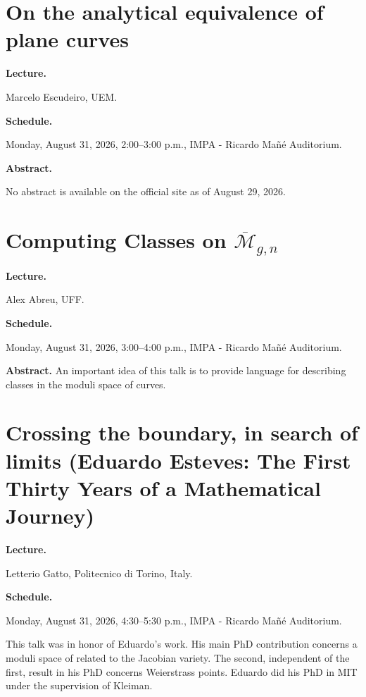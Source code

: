 \section{On the analytical equivalence of
plane curves}
\label{section-analytical-equivalence-curves}

\medskip\noindent
{\bf Lecture.}

Marcelo Escudeiro,
UEM.

\medskip\noindent
{\bf Schedule.}

Monday, August 31, 2026,
2:00--3:00 p.m.,
IMPA - Ricardo Ma\~n\'e Auditorium.

\medskip\noindent
{\bf Abstract.}

No abstract is available on the official
site as of August 29, 2026.

\section{Computing Classes on
$\overline{\mathcal{M}}_{g,n}$}
\label{section-computing-classes-moduli}

\medskip\noindent
{\bf Lecture.}

Alex Abreu,
UFF.

\medskip\noindent
{\bf Schedule.}

Monday, August 31, 2026,
3:00--4:00 p.m.,
IMPA - Ricardo Ma\~n\'e Auditorium.

\medskip\noindent
{\bf Abstract.}
An important idea of this talk is to
provide language for
describing classes in the moduli space of
curves.


\section{Crossing the boundary, in search
of limits (Eduardo Esteves: The First
Thirty Years of a Mathematical Journey)}
\label{section-crossing-boundary-gatto}

\medskip\noindent
{\bf Lecture.}

Letterio Gatto,
Politecnico di Torino, Italy.

\medskip\noindent
{\bf Schedule.}

Monday, August 31, 2026,
4:30--5:30 p.m.,
IMPA - Ricardo Ma\~n\'e Auditorium.

\medskip\noindent
This talk was in honor of Eduardo's work.
His main PhD contribution concerns
a moduli space of related to the Jacobian
variety. The second,
independent of the first, result in his PhD
concerns Weierstrass points. Eduardo did his
PhD in MIT under the supervision
of Kleiman.

